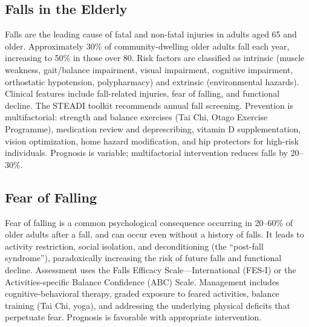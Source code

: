 






\label{sec:Falls and Mobility Disorders}

\subsection{Falls in the Elderly}
\label{sec:Falls in the Elderly}

Falls are the leading cause of fatal and non-fatal injuries in adults aged 65 and older. Approximately 30\% of community-dwelling older adults fall each year, increasing to 50\% in those over 80. Risk factors are classified as intrinsic (muscle weakness, gait/balance impairment, visual impairment, cognitive impairment, orthostatic hypotension, polypharmacy) and extrinsic (environmental hazards). Clinical features include fall-related injuries, fear of falling, and functional decline. The STEADI toolkit recommends annual fall screening. Prevention is multifactorial: strength and balance exercises (Tai Chi, Otago Exercise Programme), medication review and deprescribing, vitamin D supplementation, vision optimization, home hazard modification, and hip protectors for high-risk individuals. Prognosis is variable; multifactorial intervention reduces falls by 20--30\%.

\subsection{Fear of Falling}
\label{sec:Fear of Falling}

Fear of falling is a common psychological consequence occurring in 20--60\% of older adults after a fall, and can occur even without a history of falls. It leads to activity restriction, social isolation, and deconditioning (the ``post-fall syndrome''), paradoxically increasing the risk of future falls and functional decline. Assessment uses the Falls Efficacy Scale---International (FES-I) or the Activities-specific Balance Confidence (ABC) Scale. Management includes cognitive-behavioral therapy, graded exposure to feared activities, balance training (Tai Chi, yoga), and addressing the underlying physical deficits that perpetuate fear. Prognosis is favorable with appropriate intervention.

